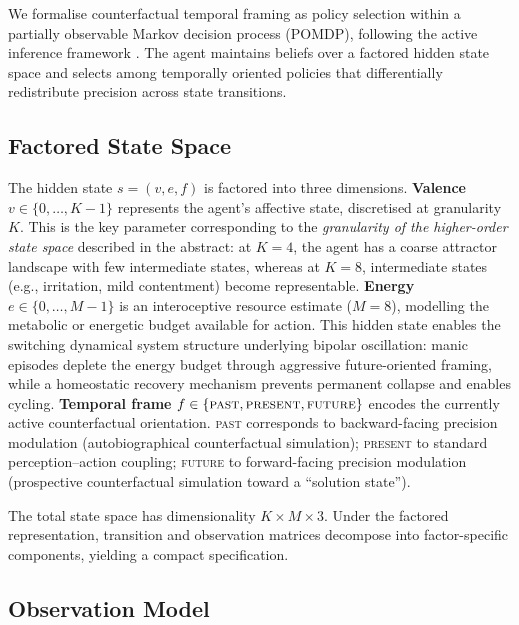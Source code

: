 \documentclass[11pt,a4paper]{article}
\begin{document}
We formalise counterfactual temporal framing as policy selection within a partially observable Markov decision process (POMDP), following the active inference framework \citep{parr2022active}. The agent maintains beliefs over a factored hidden state space and selects among temporally oriented policies that differentially redistribute precision across state transitions.

\subsection{Factored State Space}

The hidden state $s = (v, e, f)$ is factored into three dimensions. \textbf{Valence} $v \in \{0, \ldots, K{-}1\}$ represents the agent's affective state, discretised at granularity $K$. This is the key parameter corresponding to the \emph{granularity of the higher-order state space} described in the abstract: at $K{=}4$, the agent has a coarse attractor landscape with few intermediate states, whereas at $K{=}8$, intermediate states (e.g., irritation, mild contentment) become representable. \textbf{Energy} $e \in \{0, \ldots, M{-}1\}$ is an interoceptive resource estimate ($M{=}8$), modelling the metabolic or energetic budget available for action. This hidden state enables the switching dynamical system structure underlying bipolar oscillation: manic episodes deplete the energy budget through aggressive future-oriented framing, while a homeostatic recovery mechanism prevents permanent collapse and enables cycling. \textbf{Temporal frame} $f \in \{\textsc{past}, \textsc{present}, \textsc{future}\}$ encodes the currently active counterfactual orientation. \textsc{past} corresponds to backward-facing precision modulation (autobiographical counterfactual simulation); \textsc{present} to standard perception--action coupling; \textsc{future} to forward-facing precision modulation (prospective counterfactual simulation toward a ``solution state'').

The total state space has dimensionality $K \times M \times 3$. Under the factored representation, transition and observation matrices decompose into factor-specific components, yielding a compact specification.

\subsection{Observation Model}
\end{document}
